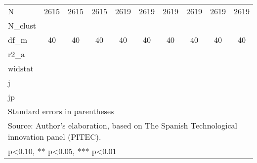 \begin{table}[htbp]
\begin{tabular}{l*{9}{c}}
\hline
N                   &        2615   &        2615   &        2615   &        2619   &        2619   &        2619   &        2619   &        2619   &        2619   \\
N\_clust             &               &               &               &               &               &               &               &               &               \\
df\_m                &          40   &          40   &          40   &          40   &          40   &          40   &          40   &          40   &          40   \\
r2\_a                &               &               &               &               &               &               &               &               &               \\
widstat             &               &               &               &               &               &               &               &               &               \\
j                   &               &               &               &               &               &               &               &               &               \\
jp                  &               &               &               &               &               &               &               &               &               \\
\hline\hline
\multicolumn{10}{l}{\footnotesize Standard errors in parentheses}\\
\multicolumn{10}{l}{\footnotesize Source: Author's elaboration, based on The Spanish Technological innovation panel (PITEC).}\\
\multicolumn{10}{l}{\footnotesize * p<0.10, ** p<0.05, *** p<0.01}\\
\end{tabular}
\end{table}
